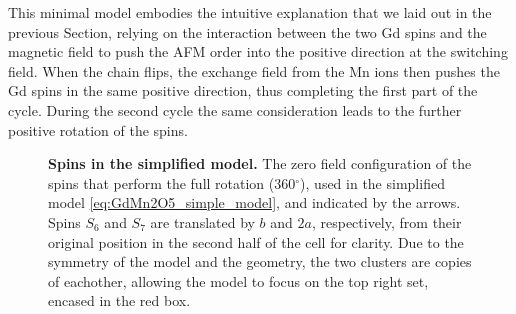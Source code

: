 This minimal model embodies the intuitive explanation that we laid out in the previous Section, relying on the interaction between the two Gd spins and the magnetic field to push the AFM order into the positive direction at the switching field.
When the chain flips, the exchange field from the Mn ions then pushes the Gd spins in the same positive direction, thus completing the first part of the cycle.
During the second cycle the same consideration leads to the further positive rotation of the spins.


\begin{figure}[b]
	\caption{\label{fig:GdMn2O5_simple_model}{\bf Spins in the simplified model.} The zero field configuration of the spins that perform the full rotation (360$^\circ$), used in the simplified model \eqref{eq:GdMn2O5_simple_model}, and indicated by the arrows. Spins $S_6$ and $S_7$ are translated by $b$ and $2a$, respectively, from their original position in the second half of the cell for clarity. Due to the symmetry of the model and the geometry, the two clusters are copies of eachother, allowing the model to focus on the top right set, encased in the red box.}
\end{figure}

